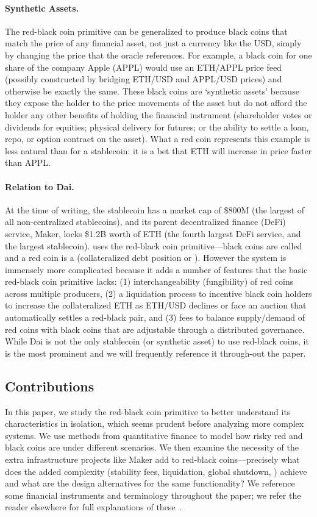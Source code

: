 \paragraph{Synthetic Assets.} The red-black coin primitive can be generalized to produce black coins that match the price of any financial asset, not just a currency like the USD, simply by changing the price that the oracle references. For example, a black coin for one share of the company Apple (APPL) would use an ETH/APPL price feed (possibly constructed by bridging ETH/USD and APPL/USD prices) and otherwise be exactly the same. These black coins are `synthetic assets' because they expose the holder to the price movements of the asset but do not afford the holder any other benefits of holding the financial instrument (\eg shareholder votes or dividends for equities; physical delivery for futures; or the ability to settle a loan, repo, or option contract on the asset). What a red coin represents this example is less natural than for a stablecoin: it is a bet that ETH will increase in price faster than APPL.

\paragraph{Relation to Dai.} At the time of writing, the stablecoin \dai has a market cap of \$800M (the largest of all non-centralized stablecoins), and its parent decentralized finance (DeFi) service, Maker, locks \$1.2B worth of ETH (the fourth largest DeFi service, and the largest stablecoin). \dai uses the red-black coin primitive---black coins are called \dai and a red coin is a \vault (\nee collateralized debt position or \cdp). However the system is immensely more complicated because it adds a number of features that the basic red-black coin primitive lacks: (1) interchangeability (fungibility) of red coins across multiple producers, (2) a liquidation process to incentive black coin holders to increase the collateralized ETH as ETH/USD declines or face an auction that automatically settles a red-black pair, and (3) fees to balance supply/demand of red coins with black coins that are adjustable through a distributed governance. While Dai is not the only stablecoin (or synthetic asset) to use red-black coins, it is the most prominent and we will frequently reference it through-out the paper.

\subsection{Contributions} In this paper, we study the red-black coin primitive to better understand its characteristics in isolation, which seems prudent before analyzing more complex systems. We use methods from quantitative finance to model how risky red and black coins are under different scenarios. We then examine the necessity of the extra infrastructure projects like Maker add to red-black coins---precisely what does the added complexity (\eg stability fees, liquidation, global shutdown, \etc) achieve and what are the design alternatives for the same functionality? We reference some financial instruments and terminology throughout the paper; we refer the reader elsewhere for full explanations of these~\cite{Har03}.

